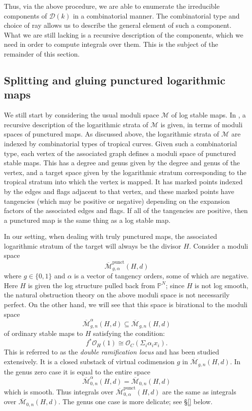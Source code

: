 \documentclass[11pt]{amsart}
\newcommand{\M}[4]{\overline{\mathcal{M}}_{#1,#2}(#3,#4)}
\newcommand{\Mpunct}[4]{\overline{\mathcal{M}}^{\operatorname{punct}}_{#1,#2}(#3,#4)}
\newcommand{\PP}{\mathbb P}
\newcommand{\OO}{\mathcal{O}}
\newcommand{\Mcal}{\mathcal{M}}
\newcommand{\Dcal}{\mathcal{D}}
\newcommand{\ol}[1]{\overline{#1}}
\theoremstyle{definition}
\theoremstyle{definition}
\begin{document}
Thus, via the above procedure, we are able to enumerate the irreducible components of $\Dcal(k)$ in a combinatorial manner. The combinatorial type and choice of ray allows us to describe the general element of such a component. What we are still lacking is a recursive description of the components, which we need in order to compute integrals over them. This is the subject of the remainder of this section.

\subsection{Splitting and gluing punctured logarithmic maps}\label{subsection punctured maps} We still start by considering the usual moduli space $\Mcal$ of log stable maps. In \cite{PuncturedMaps}, a recursive description of the logarithmic strata of $\Mcal$ is given, in terms of moduli spaces of punctured maps. As discussed above, the logarithmic strata of $\Mcal$ are indexed by combinatorial types of tropical curves. Given such a combinatorial type, each vertex of the associated graph defines a moduli space of punctured stable maps. This has a degree and genus given by the degree and genus of the vertex, and a target space given by the logarithmic stratum corresponding to the tropical stratum into which the vertex is mapped. It has marked points indexed by the edges and flags adjacent to that vertex, and these marked points have tangencies (which may be positive or negative) depending on the expansion factors of the associated edges and flags. If all of the tangencies are positive, then a punctured map is the same thing as a log stable map.

In our setting, when dealing with truly punctured maps, the associated logarithmic stratum of the target will always be the divisor $H$. Consider a moduli space
\begin{equation*} \Mpunct{g}{\alpha}{H}{d} \end{equation*}
where $g \in \{0,1\}$ and $\alpha$ is a vector of tangency orders, some of which are negative. Here $H$ is given the log structure pulled back from $\PP^N$; since $H$ is not log smooth, the natural obstruction theory on the above moduli space is not necessarily perfect. On the other hand, we will see that this space is birational to the moduli space
\begin{equation*} \ol\Mcal^{\alpha}_{g,n}(H,d) \subseteq \M{g}{n}{H}{d} \end{equation*}
of ordinary stable maps to $H$ satisfying the condition:
\begin{equation*} f^*\OO_H(1) \cong \OO_C(\Sigma_i \alpha_ix_i).\end{equation*}
This is referred to as the \emph{double ramification locus} and has been studied extensively. It is a closed substack of virtual codimension $g$ in $\M{g}{n}{H}{d}$. In the genus zero case it is equal to the entire space
\begin{equation*} \ol\Mcal^{\alpha}_{0,n}(H,d) = \M{0}{n}{H}{d} \end{equation*}
which is smooth. Thus integrals over $\Mpunct{0}{\alpha}{H}{d}$ are the same as integrals over $\M{0}{n}{H}{d}$. The genus one case is more delicate; see \S \ref{} below.
\end{document}
